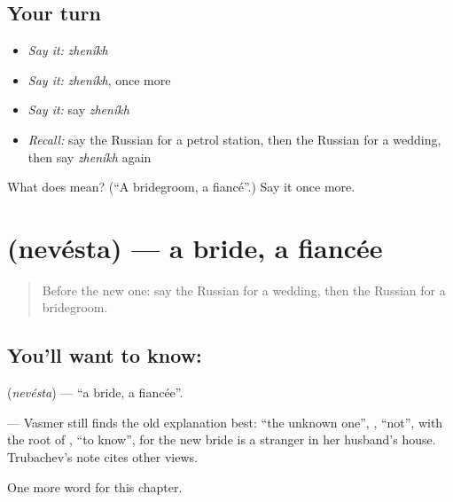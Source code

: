 \subsection*{Your turn}
\begin{itemize}
\raggedright
  \item \emph{Say it:} \emph{zheníkh}
  \item \emph{Say it:} \emph{zheníkh}, once more
  \item \emph{Say it:} say \emph{zheníkh}
  \item \emph{Recall:} say the Russian for a petrol station, then the Russian for a wedding, then say \emph{zheníkh} again
\end{itemize}

\begin{tcolorbox}[breakable,colback=teal!4,colframe=teal!35!black,title={Before you move on}]
What does  mean? (\textquotedblleft{}A bridegroom, a fiancé\textquotedblright{}.) Say it once more.
\end{tcolorbox}
\section[\texorpdfstring{\ru{невеста} (nevésta)}{невеста (nevésta)}]{ (nevésta) — a bride, a fiancée}

\label{lesson:RU-C168-nevesta}



\begin{quote}
Before the new one: say the Russian for a wedding, then the Russian for a bridegroom.
\end{quote}

\subsection*{You'll want to know: }
\textbf{} (\emph{nevésta}) — \textquotedblleft{}a bride, a fiancée\textquotedblright{}.

\begin{cousinweb}
\textbf{} — Vasmer still finds the old explanation best: \textquotedblleft{}the unknown one\textquotedblright{}, \emph{}, \textquotedblleft{}not\textquotedblright{}, with the root of \emph{}, \textquotedblleft{}to know\textquotedblright{}, for the new bride is a stranger in her husband's house. Trubachev's note cites other views.
\end{cousinweb}

\begin{grammarlens}[title={What you've built}]
One more word for this chapter.
\end{grammarlens}

